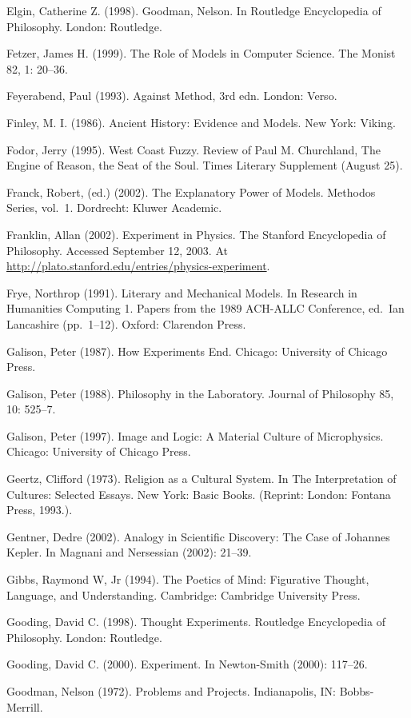 Elgin, Catherine Z. (1998). Goodman, Nelson. In Routledge Encyclopedia
of Philosophy. London: Routledge.

Fetzer, James H. (1999). The Role of Models in Computer Science. The
Monist 82, 1: 20--36.

Feyerabend, Paul (1993). Against Method, 3rd edn. London: Verso.

Finley, M. I. (1986). Ancient History: Evidence and Models. New York:
Viking.

Fodor, Jerry (1995). West Coast Fuzzy. Review of Paul M. Churchland, The
Engine of Reason, the Seat of the Soul. Times Literary Supplement
(August 25).

Franck, Robert, (ed.) (2002). The Explanatory Power of Models. Methodos
Series, vol.~1. Dordrecht: Kluwer Academic.

Franklin, Allan (2002). Experiment in Physics. The Stanford Encyclopedia
of Philosophy. Accessed September 12, 2003. At
\url{http://plato.stanford.edu/entries/physics-experiment}.

Frye, Northrop (1991). Literary and Mechanical Models. In Research in
Humanities Computing 1. Papers from the 1989 ACH-ALLC Conference,
ed.~Ian Lancashire (pp.~1--12). Oxford: Clarendon Press.

Galison, Peter (1987). How Experiments End. Chicago: University of
Chicago Press.

Galison, Peter (1988). Philosophy in the Laboratory. Journal of
Philosophy 85, 10: 525--7.

Galison, Peter (1997). Image and Logic: A Material Culture of
Microphysics. Chicago: University of Chicago Press.

Geertz, Clifford (1973). Religion as a Cultural System. In The
Interpretation of Cultures: Selected Essays. New York: Basic Books.
(Reprint: London: Fontana Press, 1993.).

Gentner, Dedre (2002). Analogy in Scientific Discovery: The Case of
Johannes Kepler. In Magnani and Nersessian (2002): 21--39.

Gibbs, Raymond W, Jr (1994). The Poetics of Mind: Figurative Thought,
Language, and Understanding. Cambridge: Cambridge University Press.

Gooding, David C. (1998). Thought Experiments. Routledge Encyclopedia of
Philosophy. London: Routledge.

Gooding, David C. (2000). Experiment. In Newton-Smith (2000): 117--26.

Goodman, Nelson (1972). Problems and Projects. Indianapolis, IN:
Bobbs-Merrill.


